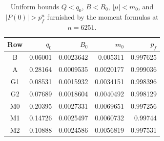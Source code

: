 \begin{table}[ht]
\centering\small
\caption{Uniform bounds $Q<q_0$, $B<B_0$, $|\mu|<m_0$, and
$|P(0)|>p_f^n$ furnished by the moment formulas at $n=6251$.}
\label{bc:refined-table}
\begin{tabular}{@{}crrrr@{}}\toprule
Row&$q_0$&$B_0$&$m_0$&$p_f$\\\midrule
B & 0.06001 & 0.0023642 & 0.005311 & 0.997625\\
A & 0.28164 & 0.0009535 & 0.0020177 & 0.999036\\
G1 & 0.08531 & 0.0015932 & 0.0034151 & 0.998396\\
G2 & 0.07689 & 0.0018604 & 0.0040492 & 0.998129\\
M0 & 0.20395 & 0.0027331 & 0.0069651 & 0.997256\\
M1 & 0.14726 & 0.0025497 & 0.0060732 & 0.99744\\
M2 & 0.10888 & 0.0024586 & 0.0056819 & 0.997531\\
\bottomrule\end{tabular}
\end{table}

